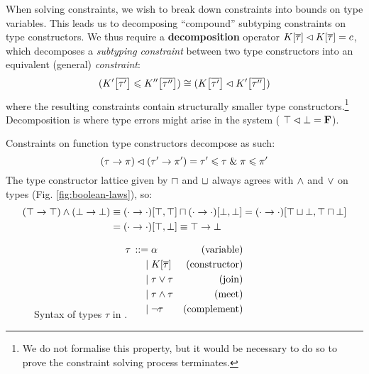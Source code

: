 When solving constraints, we wish to break down constraints into bounds on type variables. This leads us to decomposing \enquote{compound} subtyping constraints on type constructors. We thus require a \textbf{decomposition} operator $K[\overline \tau] \lhd K[\overline \tau] = c$, which decomposes a \emph{subtyping constraint} between two type constructors into an equivalent (general) \emph{constraint}:
$$ (\constr'\left[\overline {\tau'}\right] \sub \constr''\left[\overline {\tau''}\right]) \cstreq (\constr\left[\overline {\tau'}\right] \cdecomp \constr'\left[\overline {\tau''}\right]) $$
where the resulting constraints contain structurally smaller type constructors.\footnote{We do not formalise this property, but it would be necessary to do so to prove the constraint solving process terminates.} Decomposition is where type errors might arise in the system (\eg{} $\top \lhd \bot = \mathbf F$). 
\begin{example}
    Constraints on function type constructors decompose as such:
    $$ (\tau \to \pi) \lhd (\tau' \to \pi') = \tau' \leqslant \tau \;\&\; \pi \leqslant \pi' $$
    The type constructor lattice given by $\sqcap$ and $\sqcup$ always agrees with $\land$ and $\lor$ on types (Fig. \ref{fig:boolean-laws}), so:
    \begin{align*}
       (\top \to \top) \land (\bot \to \bot) 
       &\equiv (\cdot \to \cdot)[\top, \top] \sqcap (\cdot \to \cdot)[\bot, \bot] = (\cdot \to \cdot)[\top \sqcup \bot, \top \sqcap \bot] \\
       &= (\cdot \to \cdot)[\top, \bot] \equiv \top \to \bot 
    \end{align*}
\end{example}

\begin{figure}
    \centering
    \begin{align*}
    {\tau} \,::=&\; 
             \alpha & \text{(variable)}
    \\ \mid&\; K[\overline \tau] & \text{(constructor)}
    \\ \mid&\; \tau \lor \tau & \text{(join)}
    \\ \mid&\; \tau \land \tau & \text{(meet)}
    \\ \mid&\; \lnot \tau & \text{(complement)} \\[-2em]
    \end{align*}
    \caption{Syntax of types $\tau$ in \inference{}.}
    \label{fig:signature-types}
\end{figure}

